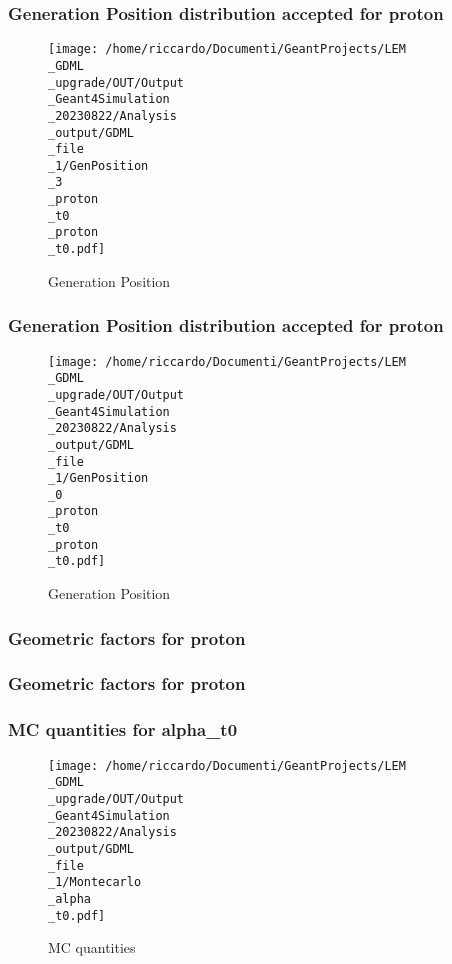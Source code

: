 \documentclass[8pt]{beamer}
\begin{document}
            \begin{frame}
                \frametitle{Generation Position distribution accepted for proton}
            
        \begin{figure}[h]
            \centering
            \texttt{[image: /home/riccardo/Documenti/GeantProjects/LEM\\\_GDML\\\_upgrade/OUT/Output\\\_Geant4Simulation\\\_20230822/Analysis\\\_output/GDML\\\_file\\\_1/GenPosition\\\_3\\\_proton\\\_t0\\\_proton\\\_t0.pdf]}
            \caption{Generation Position}
        \end{figure}
        
            \end{frame}
            
            \begin{frame}
                \frametitle{Generation Position distribution accepted for proton}
            
        \begin{figure}[h]
            \centering
            \texttt{[image: /home/riccardo/Documenti/GeantProjects/LEM\\\_GDML\\\_upgrade/OUT/Output\\\_Geant4Simulation\\\_20230822/Analysis\\\_output/GDML\\\_file\\\_1/GenPosition\\\_0\\\_proton\\\_t0\\\_proton\\\_t0.pdf]}
            \caption{Generation Position}
        \end{figure}
        
            \end{frame}
            
            \begin{frame}
                \frametitle{Geometric factors for proton}
            
            \end{frame}
            
            \begin{frame}
                \frametitle{Geometric factors for proton}
            
            \end{frame}
            
            \begin{frame}
                \frametitle{MC quantities for alpha\_t0}
            
        \begin{figure}[h]
            \centering
            \texttt{[image: /home/riccardo/Documenti/GeantProjects/LEM\\\_GDML\\\_upgrade/OUT/Output\\\_Geant4Simulation\\\_20230822/Analysis\\\_output/GDML\\\_file\\\_1/Montecarlo\\\_alpha\\\_t0.pdf]}
            \caption{MC quantities}
        \end{figure}
        
            \end{frame}
            
\end{document}
